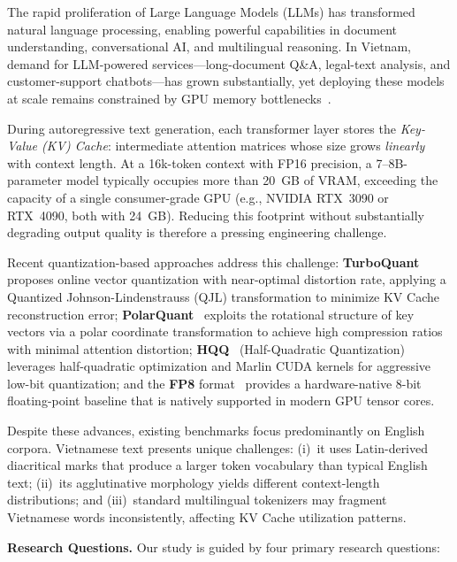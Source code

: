 \documentclass[10pt,twocolumn]{article}
\begin{document}
The rapid proliferation of Large Language Models (LLMs) has transformed
natural language processing, enabling powerful capabilities in
document understanding, conversational AI, and multilingual reasoning.
In Vietnam, demand for LLM-powered services---long-document
Q\&A, legal-text analysis, and customer-support chatbots---has grown
substantially, yet deploying these models at scale remains constrained
by GPU memory bottlenecks~\cite{kwon2023pagedattention}.

During autoregressive text generation, each transformer layer stores
the \emph{Key-Value (KV) Cache}: intermediate attention matrices whose
size grows \emph{linearly} with context length.
At a 16k-token context with FP16 precision, a 7--8B-parameter model
typically occupies more than 20~GB of VRAM, exceeding the capacity
of a single consumer-grade GPU (e.g., NVIDIA RTX~3090 or RTX~4090,
both with 24~GB).
Reducing this footprint without substantially degrading output quality
is therefore a pressing engineering challenge.

Recent quantization-based approaches address this challenge:
\textbf{TurboQuant}~\cite{Zandieh2025TurboQuant} proposes online vector
quantization with near-optimal distortion rate, applying a Quantized
Johnson-Lindenstrauss (QJL) transformation to minimize KV Cache
reconstruction error;
\textbf{PolarQuant}~\cite{wu2025polarquant} exploits the rotational
structure of key vectors via a polar coordinate transformation
to achieve high compression ratios with minimal attention distortion;
\textbf{HQQ}~\cite{badri2023hqq} (Half-Quadratic Quantization)
leverages half-quadratic optimization and Marlin CUDA kernels
for aggressive low-bit quantization;
and the \textbf{FP8} format~\cite{micikevicius2022fp8} provides
a hardware-native 8-bit floating-point baseline that is natively
supported in modern GPU tensor cores.

Despite these advances, existing benchmarks focus predominantly on
English corpora.
Vietnamese text presents unique challenges:
(i)~it uses Latin-derived diacritical marks that produce a larger
token vocabulary than typical English text;
(ii)~its agglutinative morphology yields different context-length
distributions; and
(iii)~standard multilingual tokenizers may fragment Vietnamese
words inconsistently, affecting KV Cache utilization patterns.

\medskip
\noindent\textbf{Research Questions.}
Our study is guided by four primary research questions:
\end{document}
